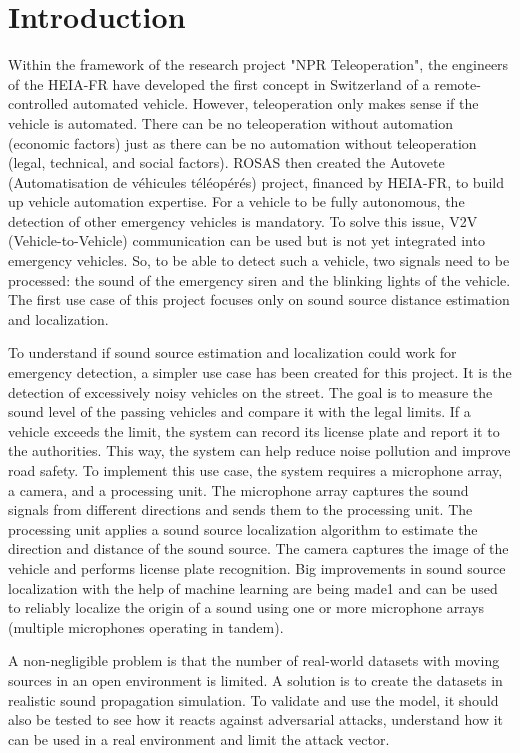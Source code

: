 \chapter{Introduction}
\label{ch:introduction}
Within the framework of the research project "NPR Teleoperation", the engineers of the HEIA-FR have
developed the first concept in Switzerland of a remote-controlled automated vehicle. However,
teleoperation only makes sense if the vehicle is automated. There can be no teleoperation without
automation (economic factors) just as there can be no automation without teleoperation (legal, technical,
and social factors). ROSAS then created the Autovete (Automatisation de véhicules téléopérés) project,
financed by HEIA-FR, to build up vehicle automation expertise.
For a vehicle to be fully autonomous, the detection of other emergency vehicles is mandatory. To solve this
issue, V2V (Vehicle-to-Vehicle) communication can be used but is not yet integrated into emergency vehicles.
So, to be able to detect such a vehicle, two signals need to be processed: the sound of the emergency siren
and the blinking lights of the vehicle. The first use case of this project focuses only on sound source
distance estimation and localization.

To understand if sound source estimation and localization could work for emergency detection, a
simpler use case has been created for this project. It is the detection of excessively noisy vehicles on the
street. The goal is to measure the sound level of the passing vehicles and compare it with the legal limits. If
a vehicle exceeds the limit, the system can record its license plate and report it to the authorities. This way,
the system can help reduce noise pollution and improve road safety.
To implement this use case, the system requires a microphone array, a camera, and a processing unit. The
microphone array captures the sound signals from different directions and sends them to the processing
unit. The processing unit applies a sound source localization algorithm to estimate the direction and distance
of the sound source. The camera captures the image of the vehicle and performs license plate recognition.
Big improvements in sound source localization with the help of machine learning are being made1 and can be
used to reliably localize the origin of a sound using one or more microphone arrays (multiple microphones operating in tandem).

A non-negligible problem is that the number of real-world datasets with moving sources in an open
environment is limited. A solution is to create the datasets in realistic sound propagation simulation.
To validate and use the model, it should also be tested to see how it reacts against adversarial attacks,
understand how it can be used in a real environment and limit the attack vector.
